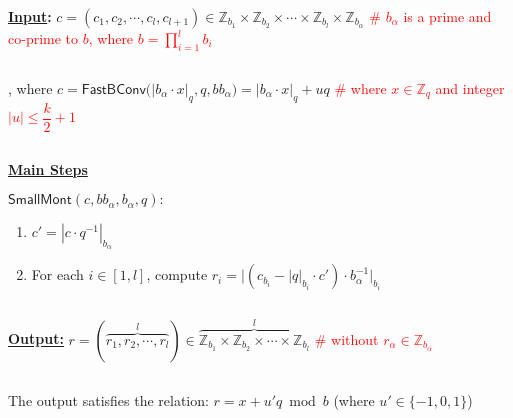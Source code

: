 \begin{tcolorbox}[title={\textbf{\tboxlabel{\ref*{subsec:rns-smallmont}} Fast Modulo Reduction: \textsf{SmallMont}}}]


\textbf{\underline{Input}:} $c = (c_1, c_2, \cdots, c_l, c_{l+1}) \in \mathbb{Z}_{b_1} \times \mathbb{Z}_{b_2} \times \cdots \times \mathbb{Z}_{b_l} \times \mathbb{Z}_{b_\alpha}$ \textcolor{red}{ \# $b_\alpha$ is a prime and co-prime to $b$, where $b = \prod\limits_{i=1}^lb_i$}

$ $

, where $c = \textsf{FastBConv}\bm(|b_\alpha \cdot x|_q, q, bb_\alpha\bm) = |b_\alpha \cdot x|_q + uq$ \textcolor{red}{ \# where $x \in \mathbb{Z}_q$ and integer $|u| \leq \dfrac{k}{2}+1$}

$ $

\textbf{\underline{Main Steps}}

\textbf{$\textsf{SmallMont}(c, bb_\alpha, b_\alpha, q): $} 

\begin{enumerate}
\item $c' = |c \cdot q^{-1}|_{b_\alpha}$
\item For each $i \in [1, l]$, compute $r_i = \Big|(c_{b_i} - |q|_{b_i}\cdot c') \cdot b_\alpha^{-1} \Big|_{b_i}$
\end{enumerate}

$ $

\textbf{\underline{Output:}} $r = (\overbrace{r_1, r_2, \cdots, r_l}^{l}) \in \overbrace{\mathbb{Z}_{b_1} \times \mathbb{Z}_{b_2} \times \cdots \times \mathbb{Z}_{b_l}}^{l}$ \textcolor{red}{ \# without $r_\alpha \in \mathbb{Z}_{b_\alpha}$}

$ $

The output satisfies the relation: $r = x + u'q \bmod b$ (where $u' \in \{-1, 0, 1\}$)

\end{tcolorbox}

